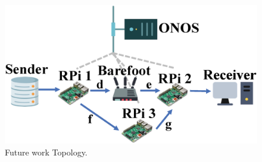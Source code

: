 \begin{figure}[tbh]
	\centering
	\includegraphics[width=.30\textwidth]{fig/scenario_3.eps}
	\caption{Future work Topology.}
	\label{scenario_3} 
\end{figure}